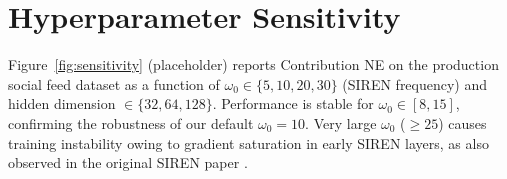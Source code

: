 \documentclass{article}
\begin{document}
\section{Hyperparameter Sensitivity}

Figure~\ref{fig:sensitivity} (placeholder) reports Contribution NE on the
production social feed dataset as a function of
$\omega_0 \in \{5, 10, 20, 30\}$ (SIREN frequency) and hidden dimension
$\in \{32, 64, 128\}$. Performance is stable for $\omega_0 \in [8, 15]$,
confirming the robustness of our default $\omega_0 = 10$. Very large
$\omega_0$ ($\geq 25$) causes training instability owing to gradient
saturation in early SIREN layers, as also observed in the original SIREN
paper \citep{sitzmann2020siren}.



\newpage

\end{document}
